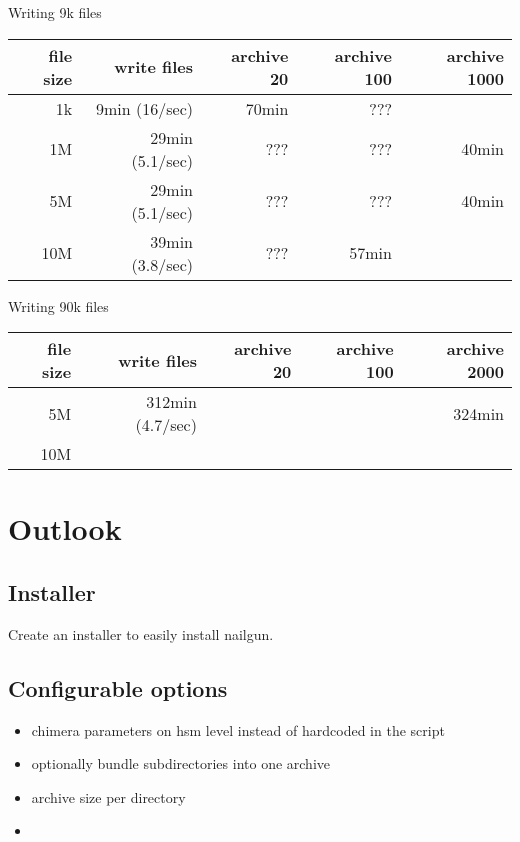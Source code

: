 \documentclass[a4paper,8pt]{scrartcl}
\begin{document}
Writing 9k files
\begin{tabular}{|r|r|r|r|r|}
  \hline
  file size & write files  & archive 20 & archive 100 & archive 1000 \\
  \hline
  1k        &  9min (16/sec)  &      70min &         ??? &              \\
  \hline
  1M        & 29min (5.1/sec) & ???        &         ??? &        40min \\
  \hline
  5M        & 29min (5.1/sec) & ???        &         ??? &        40min \\
  \hline
  10M       & 39min (3.8/sec) &        ??? &       57min &              \\
  \hline
\end{tabular}

Writing 90k files
\begin{tabular}{|r|r|r|r|r|}
  \hline
  file size & write files  & archive 20 & archive 100 & archive 2000 \\
  \hline
  5M        & 312min (4.7/sec) & & & 324min \\
  \hline
  10M       & & & & \\
  \hline
\end{tabular}

\section{Outlook}

\subsection{Installer}
Create an installer to easily install nailgun.

\subsection{Configurable options}
\begin{itemize}
  \item chimera parameters on hsm level instead of hardcoded in the script
  \item optionally bundle subdirectories into one archive
  \item archive size per directory
  \item 
\end{itemize}
\end{document}
